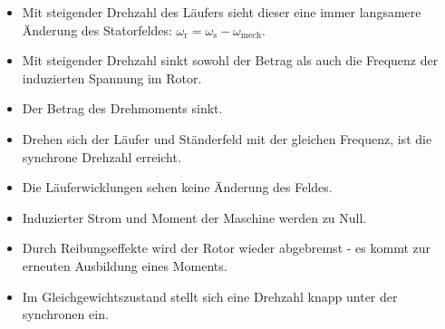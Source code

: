 \begin{frame}	    
	\begin{itemize}
		\item Mit steigender Drehzahl des Läufers sieht dieser eine immer langsamere Änderung des Statorfeldes:
		$\omega_\mathrm{r} = \omega_\mathrm{s} - \omega_\mathrm{mech}$.\pause
		\item Mit steigender Drehzahl sinkt sowohl der Betrag als auch die Frequenz der induzierten Spannung im Rotor.\pause
		\item Der Betrag des Drehmoments sinkt.\pause
		\item Drehen sich der Läufer und Ständerfeld mit der gleichen Frequenz, ist die synchrone Drehzahl erreicht.\pause
		\item Die Läuferwicklungen sehen keine Änderung des Feldes.\pause
		\item Induzierter Strom und Moment der Maschine werden zu Null.\pause
		\item Durch Reibungseffekte wird der Rotor wieder abgebremst - es kommt zur erneuten Ausbildung eines Moments.\pause
		\item Im Gleichgewichtszustand stellt sich eine Drehzahl knapp unter der synchronen ein.
	\end{itemize}
\end{frame}


